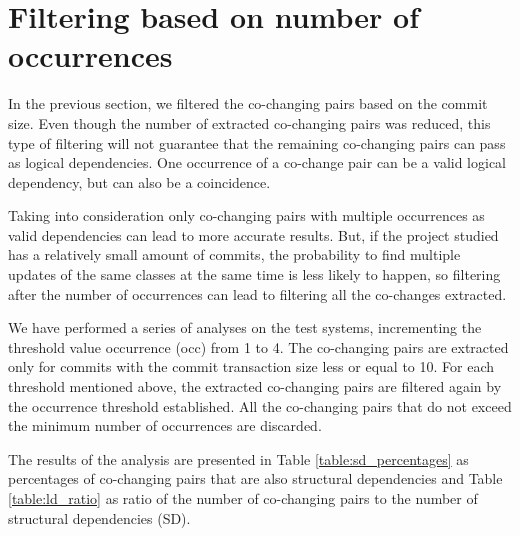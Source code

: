 \documentclass[12pt, a4paper, twoside]{report}
\begin{document}
\section{Filtering based on number of occurrences}
\label{sec:filterocc}

In the previous section, we filtered the co-changing pairs based on the commit size. Even though the number of extracted co-changing pairs was reduced, this type of filtering will not guarantee that the remaining co-changing pairs can pass as logical dependencies. 
One occurrence of a co-change pair can be a valid logical dependency, but can also be a coincidence. 

Taking into consideration only co-changing pairs with multiple occurrences as valid dependencies can lead to more accurate results. But, if the project studied has a relatively small amount of commits, the probability to find multiple updates of the same classes at the same time is less likely to happen, so filtering after the number of occurrences can lead to filtering all the co-changes extracted.

We have performed a series of analyses on the test systems, incrementing the threshold value occurrence (occ) from 1 to 4. The co-changing pairs are extracted only for commits with the commit transaction size less or equal to 10. For each threshold mentioned above, the extracted co-changing pairs are filtered again by the occurrence threshold established. All the co-changing pairs that do not exceed the minimum number of occurrences are discarded.

The results of the analysis are presented in Table \ref{table:sd_percentages} as percentages of co-changing pairs that are also structural dependencies and Table \ref{table:ld_ratio} as ratio of the number of co-changing pairs to the number of structural dependencies (SD).
\end{document}
